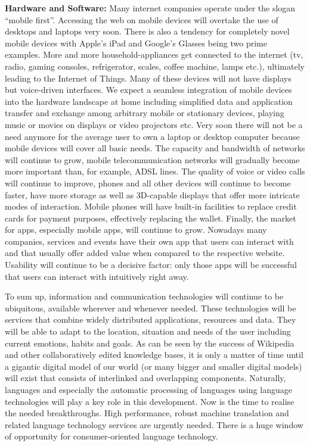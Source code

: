 \documentclass[10pt, plain]{../../metanetpaper}
\begin{document}
\begin{multicols}{2}
\textbf{Hardware and Software:} Many internet companies operate under the slogan ``mobile first''. Accessing the web on mobile devices will overtake the use of desktops and laptops very soon. There is also a tendency for completely novel mobile devices with Apple's iPad and Google's Glasses being two prime examples. More and more household-appliances get connected to the internet (tv, radio, gaming consoles, refrigerator, scales, coffee machine, lamps etc.), ultimately leading to the Internet of Things. Many of these devices will not have displays but voice-driven interfaces. We expect a seamless integration of mobile devices into the hardware landscape at home including simplified data and application transfer and exchange among arbitrary mobile or stationary devices, playing music or movies on displays or video projectors etc. Very soon there will not be a need anymore for the average user to own a laptop or desktop computer because mobile devices will cover all basic needs. The capacity and bandwidth of networks will continue to grow, mobile telecommunication networks will gradually become more important than, for example, ADSL lines. The quality of voice or video calls will continue to improve, phones and all other devices will continue to become faster, have more storage as well as 3D-capable displays that offer more intricate modes of interaction. Mobile phones will have built-in facilities to replace credit cards for payment purposes, effectively replacing the wallet. Finally, the market for apps, especially mobile apps, will continue to grow. Nowadays many companies, services and events have their own app that users can interact with and that usually offer added value when compared to the respective website. Usability will continue to be a decisive factor: only those apps will be successful that users can interact with intuitively right away.

To sum up, information and communication technologies will continue to be ubiquitous, available wherever and whenever needed. These technologies will be services that combine widely distributed applications, resources and data. They will be able to adapt to the location, situation and needs of the user including current emotions, habits and goals. As can be seen by the success of Wikipedia and other collaboratively edited knowledge bases, it is only a matter of time until a gigantic digital model of our world (or many bigger and smaller digital models) will exist that consists of interlinked and overlapping components. Naturally, languages and especially the automatic processing of languages using language technologies will play a key role in this development. Now is the time to realise the needed breakthroughs. High performance, robust machine translation and related language technology services are urgently needed. There is a huge window of opportunity for consumer-oriented language technology.


\end{multicols}
\end{document}
